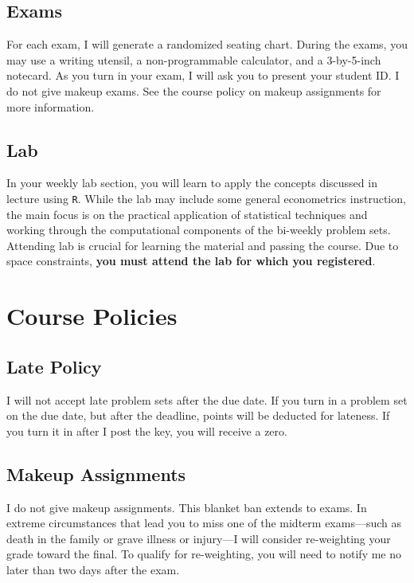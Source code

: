 \documentclass[10pt]{article}
\begin{document}
\subsection*{Exams} 

For each exam, I will generate a randomized seating chart. 
During the exams, you may use a writing utensil, a non-programmable calculator, and a 3-by-5-inch notecard. 
As you turn in your exam, I will ask you to present your student ID. 
I do not give makeup exams. 
See the course policy on makeup assignments for more information.  

\subsection*{Lab} 

In your weekly lab section, you will learn to apply the concepts discussed in lecture using \texttt{R}. 
While the lab may include some general econometrics instruction, the main focus is on the practical application of statistical techniques and working through the computational components of the bi-weekly problem sets. 
Attending lab is crucial for learning the material and passing the course. 
Due to space constraints, \textbf{you must attend the lab for which you registered}.

\newpage

\section*{Course Policies}

\subsection*{Late Policy} 

I will not accept late problem sets after the due date. If you turn in a problem set on the due date, but after the deadline, points will be deducted for lateness. If you turn it in after I post the key, you will receive a zero.

\subsection*{Makeup Assignments} 

I do not give makeup assignments. This blanket ban extends to exams. In extreme circumstances that lead you to miss one of the midterm exams---such as death in the family or grave illness or injury---I will consider re-weighting your grade toward the final. To qualify for re-weighting, you will need to notify me no later than two days after the exam.
\end{document}
